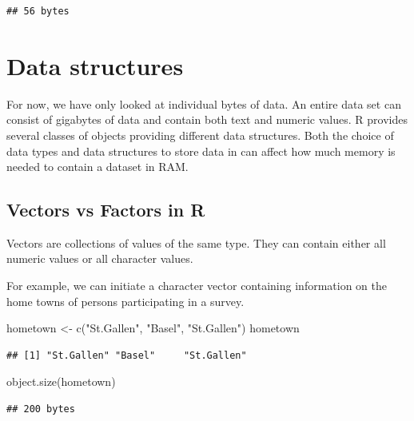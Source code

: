 \documentclass[
  12pt,
]{style/krantz}
\newenvironment{Shaded}{\begin{snugshade}}{\end{snugshade}}
\newcommand{\FunctionTok}[1]{\textcolor[rgb]{0.00,0.00,0.00}{#1}}
\newcommand{\NormalTok}[1]{#1}
\newcommand{\OtherTok}[1]{\textcolor[rgb]{0.56,0.35,0.01}{#1}}
\newcommand{\StringTok}[1]{\textcolor[rgb]{0.31,0.60,0.02}{#1}}
\begin{document}
\begin{verbatim}
## 56 bytes
\end{verbatim}

\hypertarget{data-structures}{%
\section{Data structures}\label{data-structures}}

For now, we have only looked at individual bytes of data. An entire data set can consist of gigabytes of data and contain both text and numeric values. R provides several classes of objects providing different data structures. Both the choice of data types and data structures to store data in can affect how much memory is needed to contain a dataset in RAM.

\hypertarget{vectors-vs-factors-in-r}{%
\subsection{Vectors vs Factors in R}\label{vectors-vs-factors-in-r}}

Vectors are collections of values of the same type. They can contain either all numeric values or all character values.

For example, we can initiate a character vector containing information on the home towns of persons participating in a survey.

\begin{Shaded}
\begin{Highlighting}[]
\NormalTok{hometown }\OtherTok{\textless{}{-}} \FunctionTok{c}\NormalTok{(}\StringTok{"St.Gallen"}\NormalTok{, }\StringTok{"Basel"}\NormalTok{, }\StringTok{"St.Gallen"}\NormalTok{)}
\NormalTok{hometown}
\end{Highlighting}
\end{Shaded}

\begin{verbatim}
## [1] "St.Gallen" "Basel"     "St.Gallen"
\end{verbatim}

\begin{Shaded}
\begin{Highlighting}[]
\FunctionTok{object.size}\NormalTok{(hometown)}
\end{Highlighting}
\end{Shaded}

\begin{verbatim}
## 200 bytes
\end{verbatim}
\end{document}
